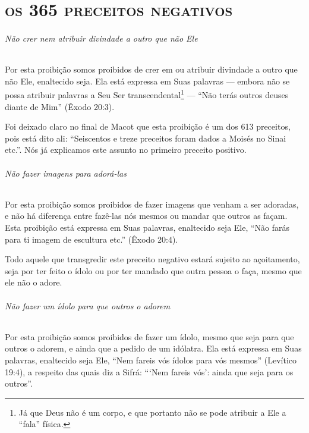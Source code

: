 \setcounter{secnumdepth}{-2}

\part{\textsc{os 365 preceitos negativos}}



\setcounter{paragraph}{0}
\setcounter{secnumdepth}{4}

\paragraph{Não crer nem atribuir divindade a outro que não Ele}

Por esta proibição somos proibidos de crer em ou atribuir divindade a
outro que não Ele, enaltecido seja. Ela está expressa em Suas palavras
--- embora não se possa atribuir palavras a Seu Ser
transcendental\footnote{Já que Deus não é um corpo, e que portanto não se pode atribuir a Ele a ``fala'' física.} --- ``Não terás outros deuses
diante de Mim'' (Êxodo 20:3).

Foi deixado claro no final de Macot que esta proibição é um dos 613
preceitos, pois está dito ali: ``Seiscentos e treze preceitos foram
dados a Moisés no Sinai etc.''. Nós já explicamos este assunto no
primeiro preceito positivo.

\paragraph{Não fazer imagens para adorá-las}

Por esta proibição somos proibidos de fazer imagens que venham a ser
adoradas, e não há diferença entre fazê-las nós mesmos ou mandar que
outros as façam. Esta proibição está expressa em Suas palavras,
enaltecido seja Ele, ``Não farás para ti imagem de escultura etc.''
(Êxodo 20:4).

Todo aquele que transgredir este preceito negativo estará sujeito ao
açoitamento, seja por ter feito o ídolo ou por ter mandado que outra
pessoa o faça, mesmo que ele não o adore.

\paragraph{Não fazer um ídolo para que outros o adorem}

Por esta proibição somos proibidos de fazer um ídolo, mesmo que seja
para que outros o adorem, e ainda que a pedido de um idólatra. Ela está
expressa em Suas palavras, enaltecido seja Ele, ``Nem fareis vós ídolos
para vós mesmos'' (Levítico 19:4), a respeito das quais diz a Sifrá:
```Nem fareis vós': ainda que seja para os outros''.

